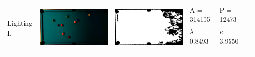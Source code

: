 \begin{table}[H]
\begin{tabular}{|l|c|c|l|l|c|}
\multirow{4}{*}{Lighting I.} & \multirow{4}{*}{\includegraphics[scale=0.08]{../images/1/7_img.png}} & \multirow{4}{*}{\includegraphics[scale=0.08]{../images/1/7_mask.png}} & A = 314105 & P = 12473 & \multirow{4}{*}{}\\ 
& & & $\lambda$ = 0.8493 & $\kappa$ = 3.9550 & \\
&&&&&\\
&&&&&\\
\hline



\end{tabular}
\end{table}

